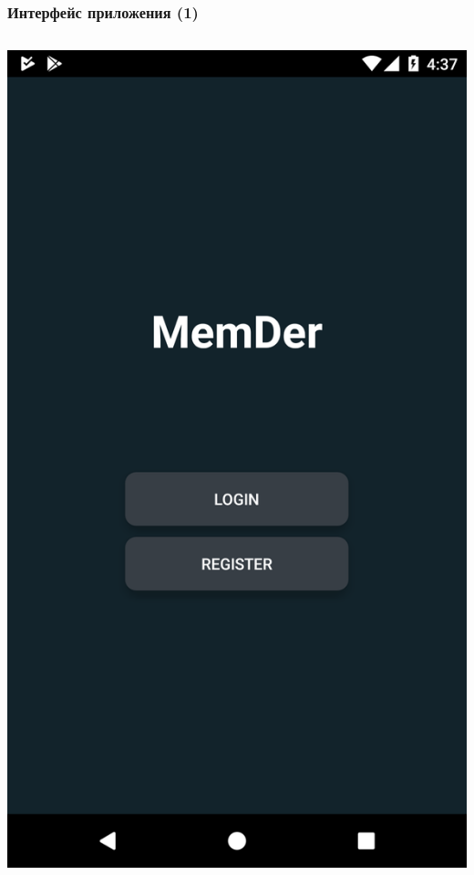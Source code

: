 \documentclass[xetex,mathserif,serif, xcolor=table]{beamer}
\begin{document}
	\begin{frame}
		\frametitle{Интерфейс приложения (1)}
            \begin{columns}[t]
                    \includegraphics[scale=0.09]{images/login.png}

\end{columns}
\end{frame}
\end{document}
